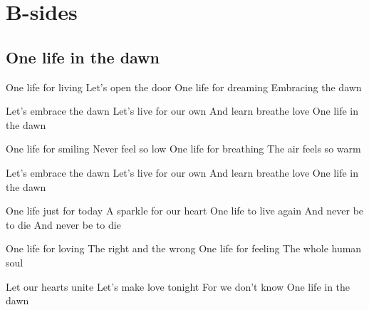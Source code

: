 \documentclass{article}
\newenvironment{album}[1]%
{%
  \section*{#1}
}%
{%
}
\newenvironment{song}[1]%
{%
  \subsection*{\textbf{#1}}
  \begin{multicols*}{2}
}%
{%
  \end{multicols*}
  \newpage
}
\newenvironment{couplet} %
{%
  \verbatim
}%
{% end code
  \endverbatim
}
\newenvironment{refrain} %
{%
  \verbatim
}%
{% end code
  \endverbatim
}
\newenvironment{pont} %
{%
  \verbatim
}%
{% end code
  \endverbatim
}
\begin{document}
\begin{album}{B-sides}
\begin{song}{One life in the dawn}
\begin{couplet}
One life for living
Let’s open the door
One life for dreaming
Embracing the dawn  
\end{couplet}
\begin{refrain}
Let’s embrace the dawn
Let’s live for our own
And learn breathe love
One life in the dawn 
\end{refrain}
\begin{couplet}
One life for smiling
Never feel so low
One life for breathing
The air feels so warm 
\end{couplet}
\begin{refrain}
Let’s embrace the dawn
Let’s live for our own
And learn breathe love
One life in the dawn  
\end{refrain}
\begin{pont}
One life just for today
A sparkle for our heart
One life to live again
And never be to die
And never be to die  
\end{pont}
\begin{couplet}
One life for loving
The right and the wrong
One life for feeling
The whole human soul  
\end{couplet}
\begin{couplet}
Let our hearts unite 
Let’s make love tonight
For we don’t know
One life in the dawn  
\end{couplet}
\end{song}


\end{album}
\end{document}
